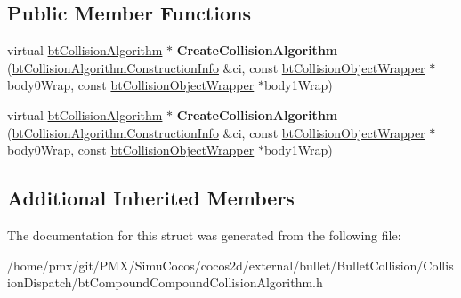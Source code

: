 \subsection*{Public Member Functions}
\begin{DoxyCompactItemize}
\item 
\mbox{\label{structbtCompoundCompoundCollisionAlgorithm_1_1SwappedCreateFunc_ad5d739dcfb86455e16f12f56a145541c}} 
virtual \hyperlink{classbtCollisionAlgorithm}{bt\+Collision\+Algorithm} $\ast$ {\bfseries Create\+Collision\+Algorithm} (\hyperlink{structbtCollisionAlgorithmConstructionInfo}{bt\+Collision\+Algorithm\+Construction\+Info} \&ci, const \hyperlink{structbtCollisionObjectWrapper}{bt\+Collision\+Object\+Wrapper} $\ast$body0\+Wrap, const \hyperlink{structbtCollisionObjectWrapper}{bt\+Collision\+Object\+Wrapper} $\ast$body1\+Wrap)
\item 
\mbox{\label{structbtCompoundCompoundCollisionAlgorithm_1_1SwappedCreateFunc_ad5d739dcfb86455e16f12f56a145541c}} 
virtual \hyperlink{classbtCollisionAlgorithm}{bt\+Collision\+Algorithm} $\ast$ {\bfseries Create\+Collision\+Algorithm} (\hyperlink{structbtCollisionAlgorithmConstructionInfo}{bt\+Collision\+Algorithm\+Construction\+Info} \&ci, const \hyperlink{structbtCollisionObjectWrapper}{bt\+Collision\+Object\+Wrapper} $\ast$body0\+Wrap, const \hyperlink{structbtCollisionObjectWrapper}{bt\+Collision\+Object\+Wrapper} $\ast$body1\+Wrap)
\end{DoxyCompactItemize}
\subsection*{Additional Inherited Members}


The documentation for this struct was generated from the following file\+:\begin{DoxyCompactItemize}
\item 
/home/pmx/git/\+P\+M\+X/\+Simu\+Cocos/cocos2d/external/bullet/\+Bullet\+Collision/\+Collision\+Dispatch/bt\+Compound\+Compound\+Collision\+Algorithm.\+h\end{DoxyCompactItemize}
